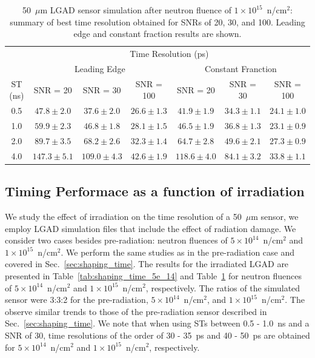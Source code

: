 \documentclass[preprint,1p]{elsarticle}
\begin{document}
  \begin{table}\label{tab:shaping_time_1e_15}
      \begin{tabular}{c|ccc|ccc}
      \multicolumn{1}{c}{}& \multicolumn{6}{c}{Time Resolution (ps)} \\
      \multicolumn{1}{c}{}&\multicolumn{3}{c}{Leading Edge} & \multicolumn{3}{c}{Constant Franction}\\ \hline
      ST (ns) & SNR = 20   & SNR = 30      & SNR = 100     & SNR = 20      & SNR = 30      & SNR = 100 \\
      0.5 & $47.8 \pm 2.0$  & $37.6 \pm 2.0$  & $26.6 \pm 1.3$  & $41.9 \pm 1.9$  & $34.3 \pm 1.1$  & $24.1 \pm 1.0$ \\
      1.0 & $59.9 \pm 2.3$  & $46.8 \pm 1.8$  & $28.1 \pm 1.5$  & $46.5 \pm 1.9$  & $36.8 \pm 1.3$  & $23.1 \pm 0.9$ \\
      2.0 & $89.7 \pm 3.5$  & $68.2 \pm 2.6$  & $32.3 \pm 1.4$  & $64.7 \pm 2.8$  & $49.6 \pm 2.1$  & $27.3 \pm 0.9$ \\
      4.0 & $147.3 \pm 5.1$  & $109.0 \pm 4.3$  & $42.6 \pm 1.9$  & $118.6 \pm 4.0$  & $84.1 \pm 3.2$  & $33.8 \pm 1.1$ \\
      \end{tabular}
      \caption{50~$\mu$m LGAD sensor simulation after neutron fluence of
       $1\times 10^{15}$~n/cm$^2$: summary of best time resolution obtained for SNRs
      of 20, 30, and 100. Leading edge and constant fraction results are shown.}
   \end{table}

\subsection{Timing Performace as a function of irradiation}\label{sec:rad_tolerance}
We study the effect of irradiation on the time resolution of a 50~$\mu$m sensor, we employ LGAD simulation files that include
the effect of radiation damage. We consider two cases besides pre-radiation: neutron fluences of
 $5\times 10^{14}$~n/cm$^2$ and $1\times 10^{15}$~n/cm$^2$. We perform the same studies as in the pre-radiation case and covered in
 Sec.~\ref{sec:shaping_time}. The results for the irradiated LGAD are presented in Table~\ref{tab:shaping_time_5e_14} and
 Table~\ref{tab:shaping_time_1e_15}  for neutron fluences of
  $5\times 10^{14}$~n/cm$^2$ and $1\times 10^{15}$~n/cm$^2$, respectively. The ratios of the simulated sensor were 3:3:2 for the pre-radiation,
   $5\times 10^{14}$~n/cm$^2$, and $1\times 10^{15}$~n/cm$^2$. The observe similar trends to those of the pre-radiation sensor described in
   Sec.~\ref{sec:shaping_time}. We note that when using STs between 0.5 - 1.0~\si{ns} and a SNR of 30, time resolutions of the order
   of 30 - 35~\si{ps} and 40 - 50~\si{ps} are obtained for $5\times 10^{14}$~n/cm$^2$ and $1\times 10^{15}$~n/cm$^2$, respectively.
\end{document}
